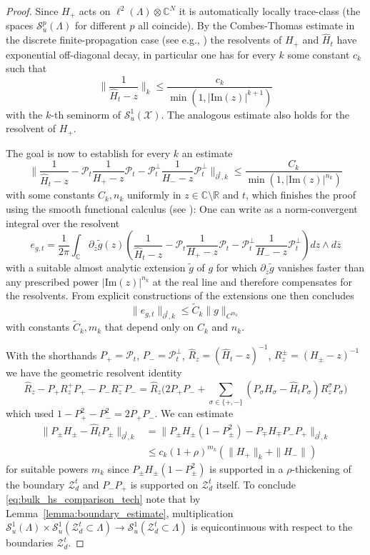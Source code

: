 \documentclass[12pt]{amsart}
\newcommand{\CM}{{\mathbb C}}
\newcommand{\RM}{{\mathbb R}}
\newcommand{\Ss}{{\mathcal S}}
\newcommand{\Xx}{{\mathcal X}}
\newcommand{\Zz}{{\mathcal Z}}
\newcommand{\pdv}{\partial}
\newcommand{\scalarmatrix}{H_-}
\begin{document}
\begin{proof}
Since $H_+$ acts on $\ell^2(\Lambda)\otimes \CM^N$ it is automatically locally trace-class (the spaces $\Ss_u^p(\Lambda)$ for different $p$ all coincide). By the Combes-Thomas estimate in the discrete finite-propagation case (see e.g., \cite[Theorem 10.5]{AizenmanWarzel}) the resolvents of $H_+$ and $\hat{H}_t$ have exponential off-diagonal decay, in particular one has for every $k$ some constant $c_k$ such that
$$\biggl\|\frac{1}{\hat{H}_t - z}\biggr\|_{k} \leq \frac{c_k}{\min(1,|\mathrm{Im}(z)|^{k+1})}$$
with the $k$-th seminorm of $\Ss_u^1(\Xx)$.
The analogous estimate also holds for the resolvent of $H_+ $. 

The goal is now to establish for every $k$ an estimate
\begin{equation}
\label{eq:bulk_hs_comparison_tech}
\biggl\|\frac{1}{\hat{H}_t - z}- \mathcal{P}_t \frac{1}{H_+ -z}\mathcal{P}_t - \mathcal{P}^\perp_t \frac{1}{\scalarmatrix-z}\mathcal{P}^\perp_t \biggr\|_{\pdv^t,k}\leq \frac{C_k}{\min(1,|\mathrm{Im}(z)|^{n_k})}
\end{equation}
with some constants $C_k, n_k$ uniformly in $z\in \CM\setminus \RM$ and $t$, which finishes the proof using the smooth functional calculus (see \cite{Davies1995}): One can write as a norm-convergent integral over the resolvent
$$
e_{g,t}=\frac{1}{2\pi}\int_{\CM} \pdv_{\overline{z}}\tilde{g}(z) \left(\frac{1}{\hat{H}_t - z}- \mathcal{P}_t \frac{1}{H_+ -z}\mathcal{P}_t - \mathcal{P}^\perp_t \frac{1}{\scalarmatrix-z}\mathcal{P}^\perp_t\right) dz\wedge d\overline{z}
$$
with a suitable almost analytic extension $\tilde{g}$ of $g$ for which $\pdv_{\overline{z}}\tilde{g}$ vanishes faster than any prescribed power $|\mathrm{Im}(z)|^{n_k}$ at the real line and therefore compensates for the resolvents. From explicit constructions of the extensions one then concludes \cite[Lemma 2.2.1]{Davies1995}
$$\bigl\|e_{g,t}\bigr\|_{\pdv^t,k} \leq \tilde{C}_{k}\|g\|_{C^{m_k}}$$
with constants $\tilde{C}_k, m_k$ that depend only on $C_k$ and $n_k$. 

With the shorthands $P_+=\mathcal{P}_t$, $P_-=\mathcal{P}^\perp_t$, $\hat{R}_z = (\hat{H}_t-z)^{-1}$, $R^\pm_z = (H_\pm -z)^{-1}$ we have the geometric resolvent identity
$$\hat{R}_z - P_+ R^+_z P_+ - P_- R^-_z P_- = \hat{R}_z\big( 2P_+P_- + \sum_{\sigma\in\{+,-\}}(P_\sigma H_\sigma -\hat{H}_t P_\sigma) R_z^\sigma P_\sigma\big)$$
which used $1-P_+^2-P_-^2=2P_+P_-$. We can estimate 
\begin{align*}
\|P_\pm H_\pm -\hat{H}_t P_\pm\|_{\pdv^t,k} &= \|P_\pm H_\pm(1-P_\pm^2)- P_\mp H_\mp P_- P_+\|_{\pdv^t,k} \\
&\leq  c_k (1+\rho)^{m_k} (\|H_+\|_{k} +\| \scalarmatrix\|)
\end{align*}
for suitable powers $m_k$ since $P_\pm H_\pm (1-P_\pm^2)$ is supported in a $\rho$-thickening of the boundary $\Zz_d^{t}$ and $P_-P_+$ is supported on $\Zz_d^{t}$ itself. To conclude   \eqref{eq:bulk_hs_comparison_tech} note that by Lemma~\ref{lemma:boundary_estimate}, multiplication $\Ss^1_u(\Lambda)\times \Ss^1_u(\Zz_d^t\subset \Lambda)\to \Ss^1_u(\Zz_d^t\subset \Lambda)$ is equicontinuous with respect to the boundaries $\Zz_d^t$.


\end{proof}
\end{document}
